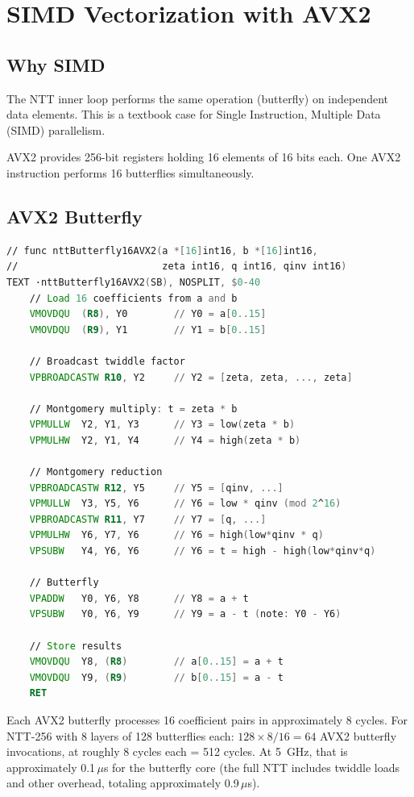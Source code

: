 \section{SIMD Vectorization with AVX2}


\subsection{Why SIMD}

The NTT inner loop performs the same operation (butterfly) on independent data elements.
This is a textbook case for Single Instruction, Multiple Data (SIMD) parallelism.

AVX2 provides 256-bit registers holding 16 elements of 16 bits each. One AVX2 instruction
performs 16 butterflies simultaneously.

\subsection{AVX2 Butterfly}

\begin{lstlisting}[language=asm,caption={AVX2 NTT butterfly (Go Plan 9 assembly)}]
// func nttButterfly16AVX2(a *[16]int16, b *[16]int16,
//                         zeta int16, q int16, qinv int16)
TEXT ·nttButterfly16AVX2(SB), NOSPLIT, $0-40
    // Load 16 coefficients from a and b
    VMOVDQU  (R8), Y0        // Y0 = a[0..15]
    VMOVDQU  (R9), Y1        // Y1 = b[0..15]

    // Broadcast twiddle factor
    VPBROADCASTW R10, Y2     // Y2 = [zeta, zeta, ..., zeta]

    // Montgomery multiply: t = zeta * b
    VPMULLW  Y2, Y1, Y3      // Y3 = low(zeta * b)
    VPMULHW  Y2, Y1, Y4      // Y4 = high(zeta * b)

    // Montgomery reduction
    VPBROADCASTW R12, Y5     // Y5 = [qinv, ...]
    VPMULLW  Y3, Y5, Y6      // Y6 = low * qinv (mod 2^16)
    VPBROADCASTW R11, Y7     // Y7 = [q, ...]
    VPMULHW  Y6, Y7, Y6      // Y6 = high(low*qinv * q)
    VPSUBW   Y4, Y6, Y6      // Y6 = t = high - high(low*qinv*q)

    // Butterfly
    VPADDW   Y0, Y6, Y8      // Y8 = a + t
    VPSUBW   Y0, Y6, Y9      // Y9 = a - t (note: Y0 - Y6)

    // Store results
    VMOVDQU  Y8, (R8)        // a[0..15] = a + t
    VMOVDQU  Y9, (R9)        // b[0..15] = a - t
    RET
\end{lstlisting}

Each AVX2 butterfly processes 16 coefficient pairs in approximately 8 cycles. For NTT-256
with 8 layers of 128 butterflies each: $128 \times 8 / 16 = 64$ AVX2 butterfly invocations,
at roughly 8 cycles each = 512 cycles. At 5~GHz, that is approximately 0.1\,$\mu$s for
the butterfly core (the full NTT includes twiddle loads and other overhead, totaling
approximately 0.9\,$\mu$s).

